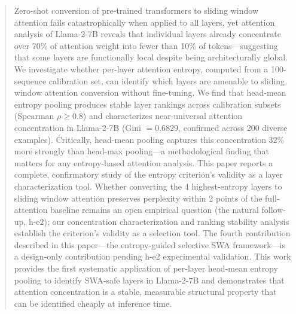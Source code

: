 \begin{abstract}
Zero-shot conversion of pre-trained transformers to sliding window attention fails catastrophically when applied to all layers, yet attention analysis of Llama-2-7B reveals that individual layers already concentrate over 70\% of attention weight into fewer than 10\% of tokens---suggesting that some layers are functionally local despite being architecturally global. We investigate whether per-layer attention entropy, computed from a 100-sequence calibration set, can identify which layers are amenable to sliding window attention conversion without fine-tuning. We find that head-mean entropy pooling produces stable layer rankings across calibration subsets (Spearman $\rho \geq 0.8$) and characterizes near-universal attention concentration in Llama-2-7B (Gini $= 0.6829$, confirmed across 200 diverse examples). Critically, head-mean pooling captures this concentration 32\% more strongly than head-max pooling---a methodological finding that matters for any entropy-based attention analysis. This paper reports a complete, confirmatory study of the entropy criterion's validity as a layer characterization tool. Whether converting the 4 highest-entropy layers to sliding window attention preserves perplexity within 2 points of the full-attention baseline remains an open empirical question (the natural follow-up, h-e2); our concentration characterization and ranking stability analysis establish the criterion's validity as a selection tool. The fourth contribution described in this paper---the entropy-guided selective SWA framework---is a design-only contribution pending h-e2 experimental validation. This work provides the first systematic application of per-layer head-mean entropy pooling to identify SWA-safe layers in Llama-2-7B and demonstrates that attention concentration is a stable, measurable structural property that can be identified cheaply at inference time.
\end{abstract}
